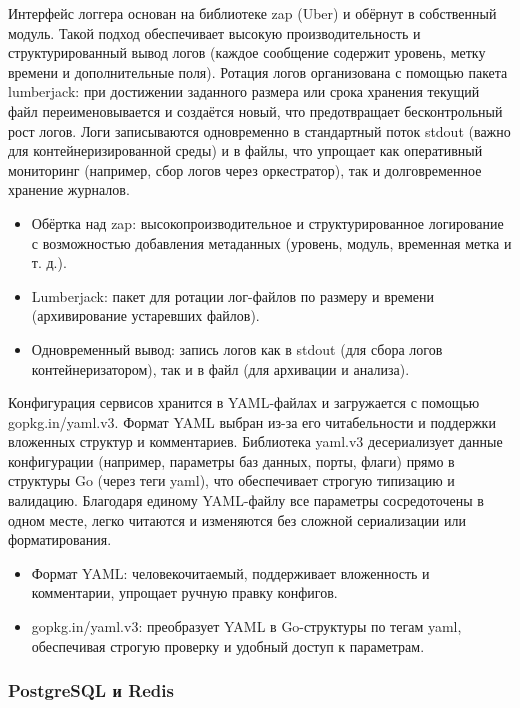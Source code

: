 Интерфейс логгера основан на библиотеке zap (Uber) и обёрнут в собственный модуль. Такой подход обеспечивает высокую производительность и структурированный вывод логов (каждое сообщение содержит уровень, метку времени и дополнительные поля). Ротация логов организована с помощью пакета lumberjack: при достижении заданного размера или срока хранения текущий файл переименовывается и создаётся новый, что предотвращает бесконтрольный рост логов. Логи записываются одновременно в стандартный поток stdout (важно для контейнеризированной среды) и в файлы, что упрощает как оперативный мониторинг (например, сбор логов через оркестратор), так и долговременное хранение журналов.

\begin{itemize}
    \item Обёртка над zap: высокопроизводительное и структурированное логирование с возможностью добавления метаданных (уровень, модуль, временная метка и т. д.).
    \item Lumberjack: пакет для ротации лог-файлов по размеру и времени (архивирование устаревших файлов).
    \item Одновременный вывод: запись логов как в stdout (для сбора логов контейнеризатором), так и в файл (для архивации и анализа).
\end{itemize}

\noindent Конфигурация сервисов хранится в YAML-файлах и загружается с помощью gopkg.in/yaml.v3. Формат YAML выбран из-за его читабельности и поддержки вложенных структур и комментариев. Библиотека yaml.v3 десериализует данные конфигурации (например, параметры баз данных, порты, флаги) прямо в структуры Go (через теги yaml), что обеспечивает строгую типизацию и валидацию. Благодаря единому YAML-файлу все параметры сосредоточены в одном месте, легко читаются и изменяются без сложной сериализации или форматирования.

\begin{itemize}
    \item Формат YAML: человекочитаемый, поддерживает вложенность и комментарии, упрощает ручную правку конфигов.
    \item gopkg.in/yaml.v3: преобразует YAML в Go-структуры по тегам yaml, обеспечивая строгую проверку и удобный доступ к параметрам.
\end{itemize}

\subsubsection*{PostgreSQL и Redis}

